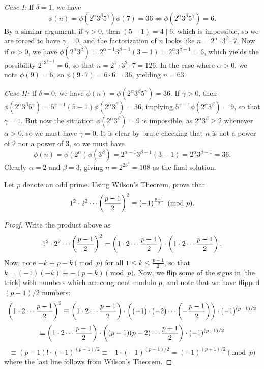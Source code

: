 \documentclass{article}
\begin{document}
\begin{exercise}
\begin{solution}
\textit{Case I:} If $\delta = 1$, we have
$$\phi(n) = \phi(2^\alpha 3^\beta 5^\gamma)\phi(7) =36 \iff \phi(2^\alpha 3^\beta 5^\gamma) = 6.$$
By a similar argument, if $\gamma > 0$, then $(5-1) = 4\mid 6$, which is impossible, so we are forced to have $\gamma =0$, and the factorization of $n$ looks like $n = 2^\alpha \cdot 3^\beta \cdot 7$. Now if $\alpha>0$, we have $\phi(2^\alpha 3^\beta) = 2^{\alpha-1}3^{\beta-1}(3-1) = 2^{\alpha}3^{\beta-1} = 6$, which yields the possibility $2^13^{2-1} = 6$, so that $n = 2^1 \cdot 3^2 \cdot 7 = \boxed{126}$. In the case where $\alpha >0$, we note $\phi(9) = 6$, so $\phi(9\cdot 7) = 6\cdot 6 = 36$, yielding $n = \boxed{63}$.

\textit{Case II:} If $\delta = 0$, we have $\phi(n) = \phi(2^\alpha 3^\beta 5^\gamma) = 36$. If $\gamma >0$, then $\phi(2^\alpha 3^\beta 5^\gamma) = 5^{\gamma-1}(5-1)\phi(2^\alpha 3^\beta) = 36$, implying $5^{\gamma-1} \phi(2^\alpha 3^\beta) = 9$, so that $\gamma= 1$. But now the situation $\phi(2^\alpha 3^\beta) = 9$ is impossible, as $2^\alpha 3^\beta \geq 2$ whenever $\alpha > 0$, so we must have $\gamma = 0$. It is clear by brute checking that $n$ is not a power of $2$ nor a power of $3$, so we must have
$$\phi(n) = \phi(2^\alpha)\phi(3^\beta) = 2^{\alpha-1} 3^{\beta-1}(3-1) = 2^{\alpha}3^{\beta-1} = 36.$$
Clearly $\alpha = 2$ and $\beta = 3$, giving $n = 2^23^3= \boxed{108}$ as the final solution.
\end{solution}
\end{exercise}

\begin{exercise}
Let $p$ denote an odd prime. Using Wilson's Theorem, prove that
$$1^2\cdot 2^2\cdots \left(\frac{p-1}2 \right)^2 \equiv (-1)^{\frac{p+1}2}\pmod p.$$
\end{exercise}
\begin{proof}
Write the product above as
\begin{equation}\label{the trick}
  1^2\cdot 2^2 \cdots \left(\frac {p-1}2 \right)^2 = \left(1\cdot 2 \cdots \frac{p-1}2 \right) \cdot \left(1\cdot 2 \cdots \frac{p-1}2 \right).  
\end{equation}
Now, note $-k \equiv p-k\pmod p$ for all $1\leq k \leq \frac{p-1}2$, so that $k = (-1)(-k)\equiv -(p-k)\pmod p$. Now, we flip some of the signs in \eqref{the trick} with numbers which are congruent modulo $p$, and note that we have flipped $(p-1)/2$ numbers:
$$\left(1\cdot 2 \cdots \frac{p-1}2 \right)^2\equiv \left(1\cdot 2 \cdots \frac{p-1}2 \right) \cdot \left((-1)\cdot (-2) \cdots \left(-\frac{p-1}2 \right) \right)\cdot (-1)^{(p-1)/2}$$
$$\equiv \left(1\cdot 2\cdots \frac{p-1}2 \right) \cdot \left((p-1)(p-2)\cdots \frac{p+1}2 \right) \cdot (-1)^{(p-1)/2}$$
$$\equiv (p-1)! \cdot (-1)^{(p-1)/2}\equiv -1\cdot (-1)^{(p-1)/2} = (-1)^{(p+1)/2}\pmod p$$
where the last line follows from Wilson's Theorem.
\end{proof}
\end{document}
